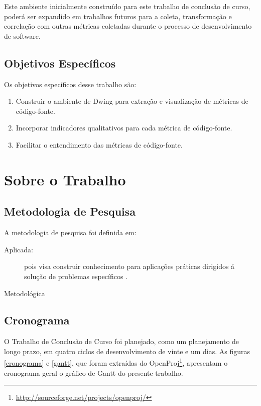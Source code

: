Este ambiente inicialmente construído para este trabalho de conclusão de curso, 
poderá ser expandido em trabalhos futuros para a coleta, transformação e 
correlação com outras métricas coletadas durante o processo de desenvolvimento 
de software. 



\subsection{Objetivos Específicos}

Os objetivos específicos desse trabalho são:

\begin{enumerate}
	
\item Construir o ambiente de Dwing para extração e visualização de métricas de 
código-fonte.
\item Incorporar indicadores qualitativos para cada métrica de código-fonte.
\item Facilitar o entendimento das métricas de código-fonte.

\end{enumerate}


\section{Sobre o Trabalho}
\subsection {Metodologia de Pesquisa}
A metodologia de pesquisa foi definida em:

\begin{description}

\item[Aplicada:] pois visa construir conhecimento para aplicações práticas 
dirigidos á solução de problemas específicos \cite{Gil2008}.

\item[Metodológica]

\end{description}

\subsection{Cronograma}
O Trabalho de Conclusão de Curso foi planejado, como um planejamento de 
longo prazo, em quatro ciclos de desenvolvimento de vinte e um dias. 
As figuras \ref{cronograma} e \ref{gantt}, que foram extraídas do 
OpenProj\footnote{\url{http://sourceforge.net/projects/openproj/}}, 
apresentam o cronograma geral o gráfico de Gantt do presente trabalho.

